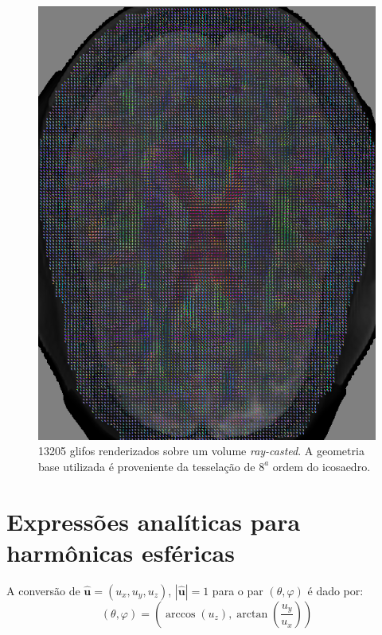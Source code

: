 \documentclass[
    12pt,                %
    oneside,            %
    a4paper,            %
    english,            %
    french,                %
    spanish,            %
    brazil                %
    ]{abntex2}
\begin{document}
  \begin{figure}[H]
     \centering
     \includegraphics[width=1.0\linewidth, angle=0]{figs/Renderizacao_glifos_evolucao/Adaptividade-multimodal/Fatia_642.png}
      \caption{13205 glifos renderizados sobre um volume \textit{ray-casted}. A geometria base utilizada é proveniente da tesselação de $8^a$ ordem do icosaedro.}
       \label{fig::qualidade_visual_longe_highres}
 \end{figure}
 
 \section{Expressões analíticas para harmônicas esféricas}
 \label{sec::harmonicas_esfericas}
 A conversão de $\mathbf{\hat{u}} = (u_x, u_y, u_z)$, $|\mathbf{\hat{u}}| = 1$ para o par $(\theta, \varphi)$ é dado por:
 \begin{equation}
     (\theta, \varphi) = (\arccos (u_z), \arctan (\frac{u_y}{u_x}))
 \end{equation}
 
\end{document}

